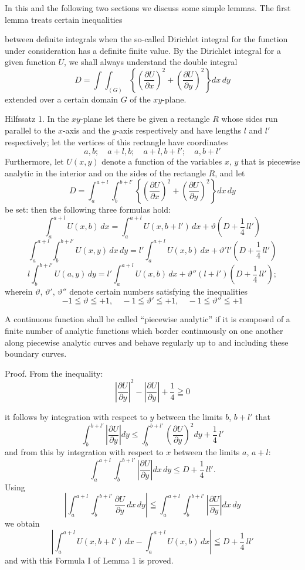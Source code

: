 \documentclass{article}
\begin{document}
In this and the following two sections we discuss some simple lemmas. The first lemma treats certain inequalities

between definite integrals when the so-called Dirichlet integral for the function under consideration has a definite finite value. By the Dirichlet integral for a given function $U$, we shall always understand the double integral
\[
D = \int\!\!\int_{(G)} \left\{ \left(\frac{\partial U}{\partial x}\right)^2 + \left(\frac{\partial U}{\partial y}\right)^2 \right\} dx\,dy
\]
extended over a certain domain $G$ of the $xy$-plane.

Hilfssatz 1. In the $xy$-plane let there be given a rectangle $R$ whose sides run parallel to the $x$-axis and the $y$-axis respectively and have lengths $l$ and $l'$ respectively; let the vertices of this rectangle have coordinates
\[
a, b; \quad a+l, b; \quad a+l, b+l'; \quad a, b+l'
\]
Furthermore, let $U(x, y)$ denote a function of the variables $x$, $y$ that is piecewise analytic in the interior and on the sides of the rectangle $R$, and let
\[
D = \int_a^{a+l} \int_b^{b+l'} \left\{ \left(\frac{\partial U}{\partial x}\right)^2 + \left(\frac{\partial U}{\partial y}\right)^2 \right\} dx\,dy
\]
be set: then the following three formulas hold:
\[
\int_a^{a+l} U(x, b)\,dx = \int_a^{a+l} U(x, b+l')\,dx + \vartheta \left(D + \frac{1}{4}\,l l'\right) \tag{I}
\]
\[
\int_a^{a+l} \int_b^{b+l'} U(x, y)\,dx\,dy = l' \int_a^{a+l} U(x, b)\,dx + \vartheta' l' \left(D + \frac{1}{4}\,l l'\right) \tag{II}
\]
\[
l \int_b^{b+l'} U(a, y)\,dy = l' \int_a^{a+l} U(x, b)\,dx + \vartheta'' (l + l') \left(D + \frac{1}{4}\,l l'\right); \tag{III}
\]
wherein $\vartheta$, $\vartheta'$, $\vartheta''$ denote certain numbers satisfying the inequalities
\[
-1 \leqq \vartheta \leqq +1, \quad -1 \leqq \vartheta' \leqq +1, \quad -1 \leqq \vartheta'' \leqq +1
\]

A continuous function shall be called ``piecewise analytic'' if it is composed of a finite number of analytic functions which border continuously on one another along piecewise analytic curves and behave regularly up to and including these boundary curves.

Proof. From the inequality:
\[
\left|\frac{\partial U}{\partial y}\right|^2 - \left|\frac{\partial U}{\partial y}\right| + \frac{1}{4} \geqq 0
\]

it follows by integration with respect to $y$ between the limits $b$, $b+l'$ that
\[
\int_b^{b+l'} \left|\frac{\partial U}{\partial y}\right| dy \le \int_b^{b+l'} \left(\frac{\partial U}{\partial y}\right)^2 dy + \frac{1}{4}\,l'
\]
and from this by integration with respect to $x$ between the limits $a$, $a+l$:
\[
\int_a^{a+l} \int_b^{b+l'} \left|\frac{\partial U}{\partial y}\right| dx\,dy \le D + \frac{1}{4}\,l l'.
\]
Using
\[
\left| \int_a^{a+l} \int_b^{b+l'} \frac{\partial U}{\partial y}\,dx\,dy \right| \leqq \int_a^{a+l} \int_b^{b+l'} \left|\frac{\partial U}{\partial y}\right| dx\,dy
\]
we obtain
\[
\left| \int_a^{a+l} U(x, b+l')\,dx - \int_a^{a+l} U(x, b)\,dx \right| \leqq D + \frac{1}{4}\,l l'
\]
and with this Formula I of Lemma 1 is proved.
\end{document}
